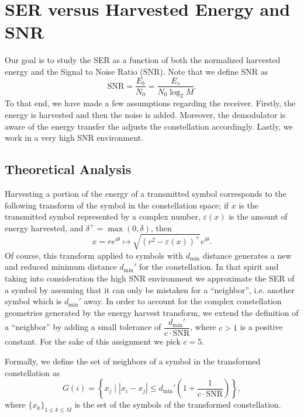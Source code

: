 \documentclass[11pt,a4paper,onecolumn,final]{article}
\newcommand{\dmin}{d_\text{min}}
\newcommand{\eps}{\varepsilon}
\begin{document}
\section{SER versus Harvested Energy and SNR}
Our goal is to study the SER as a function of both the normalized harvested energy and the Signal to Noise Ratio (SNR). Note that we define SNR as 
\begin{equation}
    \text{SNR} = \frac{E_b}{N_0} = \frac{E_s }{N_0 \log_2 M}. 
\end{equation}
To that end, we have made a few assumptions regarding the receiver. Firstly, the energy is harvested and then the noise is added. Moreover, the demodulator is aware of the energy transfer the adjusts the constellation accordingly. Lastly, we work in a very high SNR environment.

\subsection{Theoretical Analysis}
Harvesting a portion of the energy of a transmitted symbol corresponds to the following transform of the symbol in the constellation space; if \(x\) is the transmitted symbol represented by a complex number, \(\eps(x)\) is the amount of energy harvested, and \(\delta^+ = \max(0, \delta)\), then 
\begin{equation}
    x = re^{i\theta} \mapsto \sqrt{(r^2 - \eps(x))^+} e^{i\theta}. 
\end{equation}
Of course, this transform applied to symbols with \(\dmin\) distance generates a new and reduced minimum distance \(\dmin '\) for the constellation. In that spirit and taking into consideration the high SNR environment we approximate the SER of a symbol by assuming that it can only be mistaken for a ``neighbor'', i.e. another symbol which is \(\dmin '\)  away. In order to account for the complex constellation geometries generated by the energy harvest transform, we extend the definition of a ``neighbor'' by adding a small tolerance of \(\dfrac{\dmin '}{c\cdot\text{SNR}}\), where \(c > 1\) is a positive constant. For the sake of this assignment we pick \(c = 5\). 

Formally, we define the set of neighbors of a symbol in the transformed constellation as 
\begin{equation}
    G(i) = \left\{ x_j \mid |x_i - x_j| \leq \dmin ' \left(1 + \frac{1}{c \cdot \text{SNR}}\right) \right\}, 
\end{equation}
where \(\{x_k\}_{1 \leq k \leq M}\) is the set of the symbols of the transformed constellation.
\end{document}
